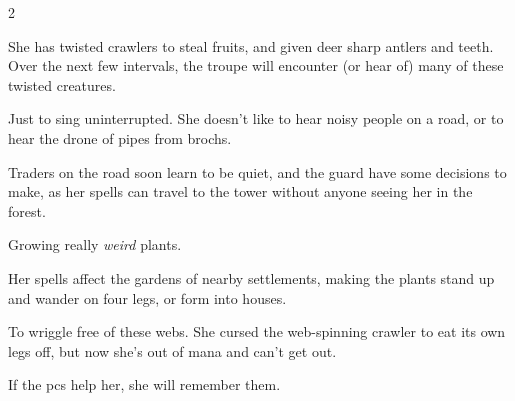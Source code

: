 \begin{multicols}{2}
\begin{dlist}
  She has twisted \glspl{crawler} to steal fruits, and given deer sharp antlers and teeth.
  Over the next few \glspl{interval}, the troupe will encounter (or hear of) many of these twisted creatures.
  \item
  Just to sing uninterrupted.
  She doesn't like to hear noisy people on a road, or to hear the drone of pipes from \glspl{broch}.

  Traders on the road soon learn to be quiet, and the \gls{guard} have some decisions to make, as her spells can travel to the tower without anyone seeing her in the forest.
  \item
  Growing really \emph{weird} plants.

  Her spells affect the gardens of nearby settlements, making the plants stand up and wander on four legs, or form into houses.
  \item
  To wriggle free of these webs.
  She cursed the web-spinning \gls{crawler} to eat its own legs off, but now she's out of mana and can't get out.

  If the \glspl{pc} help her, she will remember them.
\end{dlist}

\end{multicols}

\section{}
\label{hag}

